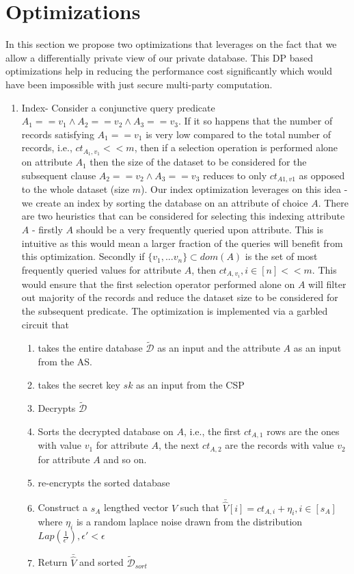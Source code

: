 \section{Optimizations}
In this section we propose two optimizations that leverages on the fact that we allow a differentially private view of our private database. This DP based optimizations help in reducing the performance cost significantly which would have been impossible with just secure multi-party computation.

\begin{enumerate}
\item Index- Consider a conjunctive query predicate $A_1==v_1 \wedge A_2==v_2 \wedge A_3==v_3 $. If it so happens that the number of records satisfying $A_1==v_1$ is very low compared to the total number of records, i.e., $ct_{A_1,v_1} << m$, then if a selection operation is performed alone on attribute $A_1$ then the size of the dataset to be considered for the subsequent clause $A_2==v_2 \wedge A_3==v_3$ reduces to only $ct_{A1,v1}$ as opposed to the whole dataset (size $m$). Our index optimization leverages on this idea - we create an index by sorting the database on an attribute of choice $A$. There are two heuristics that can be considered for selecting this indexing attribute $A$ - firstly $A$ should be a very frequently queried upon attribute. This is intuitive as this would mean a larger fraction of the queries will benefit from this optimization. Secondly if $\{v_1,...v_n\} \subset dom(A)$ is the set of most frequently queried values for attribute $A$, then $ct_{A,v_i}, i \in [n] << m$. This would ensure that the first selection operator performed alone on $A$ will filter out majority of the records and reduce the  dataset size to be considered for the subsequent predicate. The optimization is implemented via a garbled circuit that \begin{enumerate}\item takes the entire database $\boldsymbol{\mathcal{\tilde{D}}}$ as an input and the attribute $A$ as an input from the AS.
\item takes the secret key $sk$ as an input from  the CSP \item Decrypts $\boldsymbol{\mathcal{\tilde{D}}}$ \item Sorts the decrypted database on $A$, i.e., the first $ct_{A,1}$ rows are the ones with value $v_1$ for attribute $A$, the next $ct_{A,2}$ are  the records with value $v_2$ for attribute $A$ and so on. \item  re-encrypts the sorted database \item Construct a $s_A$ lengthed vector $\hat{V}$ such that $\bar{\hat{V}}[i]=ct_{A,i}+\eta_i, i \in [s_A]$ where $\eta_i$ is a random laplace noise drawn from the distribution $Lap(\frac{1}{\epsilon'}), \epsilon' < \epsilon $ \item Return $\bar{\hat{V}}$ and sorted $\boldsymbol{\mathcal{\tilde{D}}}_{sort}$\end{enumerate}

\end{enumerate}
